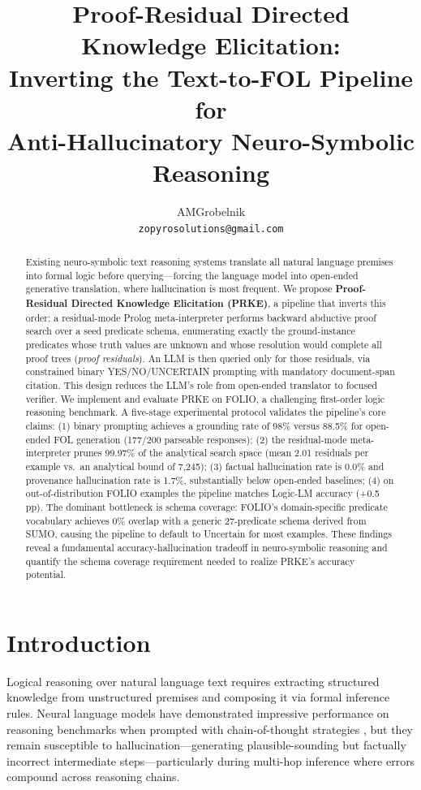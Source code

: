 \documentclass[11pt,letterpaper]{article}
\title{\textbf{Proof-Residual Directed Knowledge Elicitation:\\
Inverting the Text-to-FOL Pipeline for\\
Anti-Hallucinatory Neuro-Symbolic Reasoning}}
\author{
AMGrobelnik \\
\texttt{zopyrosolutions@gmail.com}
}
\date{}
\begin{document}
\maketitle

\begin{abstract}
Existing neuro-symbolic text reasoning systems translate all natural language premises into formal logic before querying---forcing the language model into open-ended generative translation, where hallucination is most frequent. We propose \textbf{Proof-Residual Directed Knowledge Elicitation (PRKE)}, a pipeline that inverts this order: a residual-mode Prolog meta-interpreter performs backward abductive proof search over a seed predicate schema, enumerating exactly the ground-instance predicates whose truth values are unknown and whose resolution would complete all proof trees (\emph{proof residuals}). An LLM is then queried only for those residuals, via constrained binary YES/NO/UNCERTAIN prompting with mandatory document-span citation. This design reduces the LLM's role from open-ended translator to focused verifier. We implement and evaluate PRKE on FOLIO, a challenging first-order logic reasoning benchmark. A five-stage experimental protocol validates the pipeline's core claims: (1) binary prompting achieves a grounding rate of 98\% versus 88.5\% for open-ended FOL generation (177/200 parseable responses); (2) the residual-mode meta-interpreter prunes 99.97\% of the analytical search space (mean 2.01 residuals per example vs.\ an analytical bound of 7,245); (3) factual hallucination rate is 0.0\% and provenance hallucination rate is 1.7\%, substantially below open-ended baselines; (4) on out-of-distribution FOLIO examples the pipeline matches Logic-LM accuracy (+0.5 pp). The dominant bottleneck is schema coverage: FOLIO's domain-specific predicate vocabulary achieves 0\% overlap with a generic 27-predicate schema derived from SUMO, causing the pipeline to default to Uncertain for most examples. These findings reveal a fundamental accuracy-hallucination tradeoff in neuro-symbolic reasoning and quantify the schema coverage requirement needed to realize PRKE's accuracy potential.
\end{abstract}

\section{Introduction}

Logical reasoning over natural language text requires extracting structured knowledge from unstructured premises and composing it via formal inference rules. Neural language models have demonstrated impressive performance on reasoning benchmarks when prompted with chain-of-thought strategies \citep{Wei2022}, but they remain susceptible to hallucination---generating plausible-sounding but factually incorrect intermediate steps---particularly during multi-hop inference where errors compound across reasoning chains.
\end{document}
